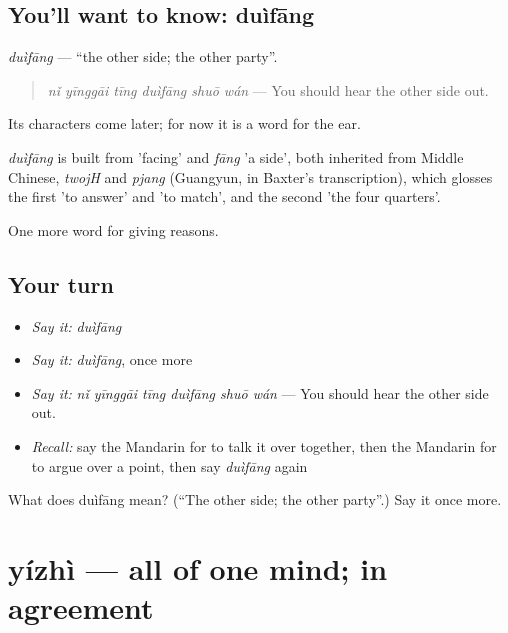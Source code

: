 \subsection*{You'll want to know: duìfāng}
\emph{duìfāng} — \textquotedblleft{}the other side; the other party\textquotedblright{}.

\begin{quote}
\emph{nǐ yīnggāi tīng duìfāng shuō wán} — You should hear the other side out.
\end{quote}

Its characters come later; for now it is a word for the ear.

\begin{cousinweb}
\emph{duìfāng} is built from  'facing' and \emph{fāng} 'a side', both inherited from Middle Chinese, \emph{twojH} and \emph{pjang} (Guangyun, in Baxter's transcription), which glosses the first 'to answer' and 'to match', and the second 'the four quarters'.
\end{cousinweb}

\begin{grammarlens}[title={What you've built}]
One more word for giving reasons.
\end{grammarlens}

\subsection*{Your turn}
\begin{itemize}
\raggedright
  \item \emph{Say it:} \emph{duìfāng}
  \item \emph{Say it:} \emph{duìfāng}, once more
  \item \emph{Say it:} \emph{nǐ yīnggāi tīng duìfāng shuō wán} — You should hear the other side out.
  \item \emph{Recall:} say the Mandarin for to talk it over together, then the Mandarin for to argue over a point, then say \emph{duìfāng} again
\end{itemize}

\begin{tcolorbox}[breakable,colback=teal!4,colframe=teal!35!black,title={Before you move on}]
What does duìfāng mean? (\textquotedblleft{}The other side; the other party\textquotedblright{}.) Say it once more.
\end{tcolorbox}
\section[yízhì]{yízhì — all of one mind; in agreement}

